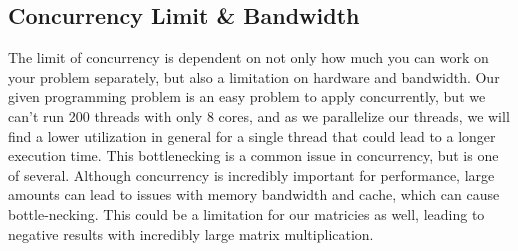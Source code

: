 \subsection{Concurrency Limit \& Bandwidth}
    The limit of concurrency is dependent on not only how much you can work on your problem separately, but also a limitation on hardware and bandwidth. Our given programming problem is an easy problem to apply concurrently, but we can't run 200 threads with only 8 cores, and as we parallelize our threads, we will find a lower utilization in general for a single thread that could lead to a longer execution time. This bottlenecking is a common issue in concurrency, but is one of several. Although concurrency is incredibly important for performance, large amounts can lead to issues with memory bandwidth and cache\cite{cuppu2001concurrency}, which can cause bottle-necking. This could be a limitation for our matricies as well, leading to negative results with incredibly large matrix multiplication.
